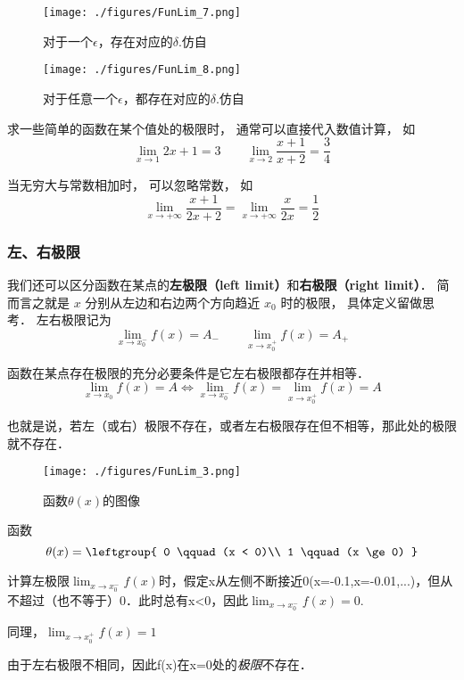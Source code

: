 \begin{figure}[ht]
\centering
\texttt{[image: ./figures/FunLim\_7.png]}
\caption{对于一个$\epsilon$，存在对应的$\delta$.仿自\cite{Thomas}} \label{FunLim_fig7}
\end{figure}

\begin{figure}[ht]
\centering
\texttt{[image: ./figures/FunLim\_8.png]}
\caption{对于任意一个$\epsilon$，都存在对应的$\delta$.仿自\cite{Thomas}} \label{FunLim_fig8}
\end{figure}

\begin{example}{}
求一些简单的函数在某个值处的极限时， 通常可以直接代入数值计算， 如
\begin{equation}
\lim_{x\to 1} 2x + 1 = 3 \qquad \lim_{x\to 2}\frac{x + 1}{x + 2} = \frac34
\end{equation}

当无穷大与常数相加时， 可以忽略常数， 如
\begin{equation}
\lim_{x\to +\infty} \frac{x + 1}{2x + 2} = \lim_{x\to +\infty} \frac{x}{2x} = \frac12
\end{equation}
\end{example}


\subsubsection{左、右极限}
我们还可以区分函数在某点的\textbf{左极限（left limit）}和\textbf{右极限（right limit）}． 简而言之就是 $x$ 分别从左边和右边两个方向趋近 $x_0$ 时的极限， 具体定义留做思考． 左右极限记为
\begin{equation}
\lim_{x\to x_0^-} f(x) = A_- \qquad \lim_{x\to x_0^+} f(x) = A_+
\end{equation}

\begin{theorem}{}
函数在某点存在极限的充分必要条件是它左右极限都存在并相等．
$$\lim_{x\to x_0} f(x) = A \Leftrightarrow \lim_{x\to x_0^-} f(x) = \lim_{x\to x_0^+} f(x) = A $$

也就是说，若左（或右）极限不存在，或者左右极限存在但不相等，那此处的极限就不存在．
\end{theorem}

\begin{example}{}
\begin{figure}[ht]
\centering
\texttt{[image: ./figures/FunLim\_3.png]}
\caption{函数$\theta(x)$的图像} \label{FunLim_fig3}
\end{figure}
函数
\begin{equation}
\theta(x) = \leftgroup{
0 \qquad (x < 0)\\
1 \qquad (x \ge 0)
}\end{equation}

计算左极限$\lim_{x\to x_0^-} f(x)$时，假定x从左侧不断接近0(x=-0.1,x=-0.01,...)，但从不超过（也不等于）0．此时总有x<0，因此$\lim_{x\to x_0^-} f(x) = 0$. 

同理，$\lim_{x\to x_0^+} f(x) = 1$

由于左右极限不相同，因此f(x)在x=0处的\textsl{极限}不存在．
\end{example}

